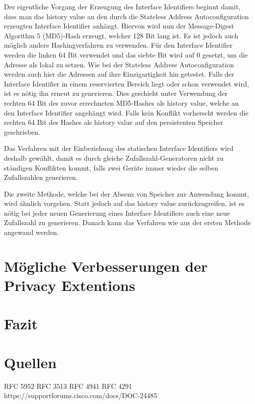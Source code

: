 \documentclass[a4paper, 12pt]{scrartcl}
\begin{document}
Der eigentliche Vorgang der Erzeugung des Interface Identifiers beginnt damit, dass man das history value an den durch die Stateless Address Autoconfiguration erzeugten Interface Identifier anhängt.
Hiervon wird nun der Message-Digest Algorithm 5 (MD5)-Hash erzeugt, welcher 128 Bit lang ist.
Es ist jedoch auch möglich andere Hashingverfahren zu verwenden.
Für den Interface Identifier werden die linken 64 Bit verwendet und das siebte Bit wird auf 0 gesetzt, um die Adresse als lokal zu setzen.
Wie bei der Stateless Address Autoconfiguration werden auch hier die Adressen auf ihre Einzigartigkeit hin getestet.
Falls der Interface Identifier in einem reservierten Bereich liegt oder schon verwendet wird, ist es nötig ihn erneut zu generieren.
Dies geschieht unter Verwendung der rechten 64 Bit des zuvor errechneten MD5-Hashes als history value, welche an den Interface Identifier angehängt wird.
Falls kein Konflikt vorherscht werden die rechten 64 Bit des Hashes als history value auf den persistenten Speicher geschrieben.

Das Verfahren mit der Einbeziehung des statischen Interface Identifiers wird deshalb gewählt, damit es durch gleiche Zufallszahl-Generatoren nicht zu ständigen Konflikten kommt, falls zwei Geräte immer wieder die selben Zufallszahlen generieren.


Die zweite Methode, welche bei der Absenz von Speicher zur Anwendung kommt, wird ähnlich vorgehen.
Statt jedoch auf das history value zurückzugreifen, ist es nötig bei jeder neuen Generierung eines Interface Identifiers auch eine neue Zufallszahl zu generieren. 
Danach kann das Verfahren wie aus der ersten Methode angewand werden.

\section{Mögliche Verbesserungen der Privacy Extentions}

\section{Fazit}
\newpage

\section{Quellen}
RFC 5952
RFC 3513
RFC 4941
RFC 4291
https://supportforums.cisco.com/docs/DOC-24485
{}


\end{document}
